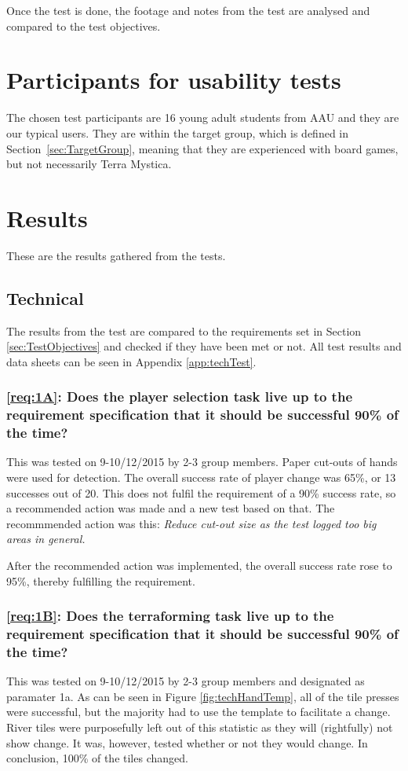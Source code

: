 Once the test is done, the footage and notes from the test are analysed and compared to the test objectives.

\section{Participants for usability tests}
The chosen test participants are 16 young adult students from AAU and they are our typical users. They are within the target group, which is defined in Section~\ref{sec:TargetGroup}, meaning that they are experienced with board games, but not necessarily Terra Mystica. 

\section{Results}
These are the results gathered from the tests.

\subsection{Technical}
The results from the test are compared to the requirements set in Section \ref{sec:TestObjectives} and checked if they have been met or not. All test results and data sheets can be seen in Appendix \ref{app:techTest}.

	\subsubsection*{\ref{req:1A}: Does the player selection task live up to the requirement specification that it should be successful 90\% of the time?}
This was tested on 9-10/12/2015 by 2-3 group members. Paper cut-outs of hands were used for detection. The overall success rate of player change was 65\%, or 13 successes out of 20. This does not fulfil the requirement of a 90\% success rate, so a recommended action was made and a new test based on that.
The recommmended action was this: \textit{Reduce cut-out size as the test logged too big areas in general.}

After the recommended action was implemented, the overall success rate rose to 95\%, thereby fulfilling the requirement.

	\subsubsection*{\ref{req:1B}: Does the terraforming task live up to the requirement specification that it should be successful 90\% of the time?}
	This was tested on 9-10/12/2015 by 2-3 group members and designated as paramater 1a. As can be seen in Figure \ref{fig:techHandTemp}, all of the tile presses were successful, but the majority had to use the template to facilitate a change. River tiles were purposefully left out of this statistic as they will (rightfully) not show change. It was, however, tested whether or not they would change. In conclusion, 100\% of the tiles changed.
	
